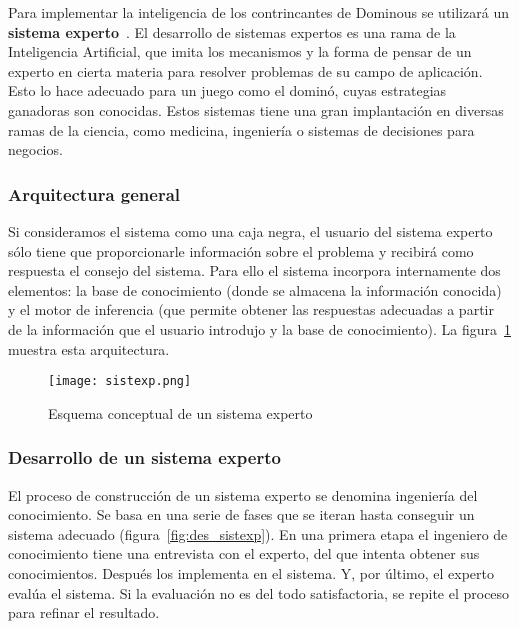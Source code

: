Para implementar la inteligencia de los contrincantes de Dominous se utilizará un
\textbf{sistema experto}~\cite{Giarratano:1989:ESP:583478}.
El desarrollo de sistemas expertos es una rama de la Inteligencia Artificial, que imita los mecanismos y la forma de
pensar de un experto en cierta materia para resolver problemas de su campo de aplicación. Esto lo hace adecuado para un juego como el dominó, cuyas estrategias ganadoras son conocidas. Estos sistemas tiene una gran implantación en diversas ramas de la ciencia, como medicina, ingeniería o sistemas de decisiones para negocios.

\subsubsection{Arquitectura general}

Si consideramos el sistema como una caja negra, el usuario del sistema experto sólo tiene que proporcionarle información sobre el problema y recibirá como respuesta el consejo del sistema. Para ello el sistema incorpora internamente dos elementos: la base de conocimiento (donde se almacena la información conocida) y el motor de inferencia (que permite obtener las respuestas adecuadas a partir de la información que el usuario introdujo y la base de conocimiento). La figura~\ref{fig:sistexp} muestra esta arquitectura. \\

\begin{figure}[h]
  \begin{center}
    \texttt{[image: sistexp.png]}
  \end{center}
  \caption{Esquema conceptual de un sistema experto}
  \label{fig:sistexp}
\end{figure}

\subsubsection{Desarrollo de un sistema experto}

El proceso de construcción de un sistema experto se denomina ingeniería del conocimiento. Se basa en una serie de fases que se iteran hasta conseguir un sistema adecuado (figura~\vref{fig:des_sistexp}). En una primera etapa el ingeniero de conocimiento tiene una entrevista con el experto, del que intenta obtener sus conocimientos. Después los implementa en el sistema. Y, por último, el experto evalúa el sistema. Si la evaluación no es del todo satisfactoria, se repite el proceso para refinar el resultado. \\

